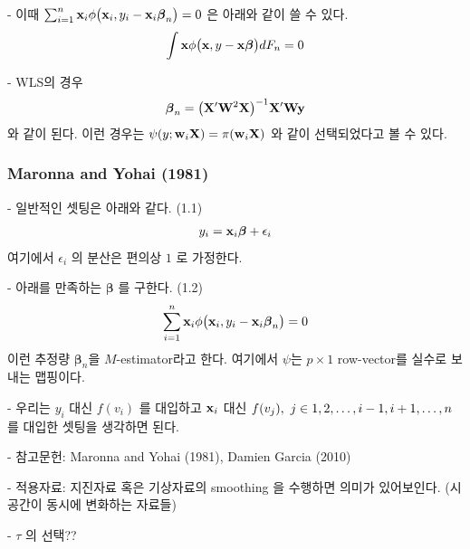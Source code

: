 \documentclass[preprint, review, 12pt]{article}
\theoremstyle{definition}
\theoremstyle{remark}
\begin{document}
- 이때 $\sum_{i=1}^{n}{\bf x}_ i \phi\big({\bf x}_ i , y_i-{\bf x}_ i \boldsymbol{\beta}_ n\big) =0$ 은 아래와 같이 쓸 수 있다. 
\begin{align}
\int {\bf x} \phi\big({\bf x} , y-{\bf x} \boldsymbol{\beta}\big) dF_n=0 
\end{align}

- WLS의 경우 
\begin{align}
\boldsymbol{\beta}_ n = \big({\bf X}'{\bf W}^2{\bf X}\big)^{-1}{\bf X}'{\bf W}{\bf y}
\end{align}
와 같이 된다. 이런 경우는 $\psi(y;{\bf w}_ i {\bf X})= \pi({\bf w}_ i {\bf X}) $ 와 같이 선택되었다고 볼 수 있다. 

\subsubsection*{Maronna and Yohai (1981)}

- 일반적인 셋팅은 아래와 같다. (1.1) 
\begin{align}
y_i={\bf x}_ i \boldsymbol{\beta}  +\epsilon_i 
\end{align}
여기에서 $\epsilon_i$ 의 분산은 편의상 $1$ 로 가정한다. 

- 아래를 만족하는 $\boldsymbol{\beta}$ 를 구한다. (1.2) 
\begin{align}
\sum_{i=1}^{n}{\bf x}_ i \phi\big({\bf x}_ i , y_i-{\bf x}_ i \boldsymbol{\beta}_ n\big) =0 
\end{align}
이런 추정량 $\boldsymbol{\beta}_ n$을 $M$-estimator라고 한다. 여기에서 $\psi$는 $p\times 1$ row-vector를 실수로 보내는 맵핑이다. 

- 우리는 $y_i$ 대신 $f(v_i)$ 를 대입하고 ${\bf x}_ i$ 대신 $f(v_j),~ j\in\\{1,2,\dots,i-1,i+1,\dots,n\\}$ 를 대입한 셋팅을 생각하면 된다. 

- 참고문헌: Maronna and Yohai (1981), Damien Garcia (2010) 

- 적용자료: 지진자료 혹은 기상자료의 smoothing 을 수행하면 의미가 있어보인다. (시공간이 동시에 변화하는 자료들) 

- $\tau$ 의 선택??
\fi
\newpage
\end{document}
